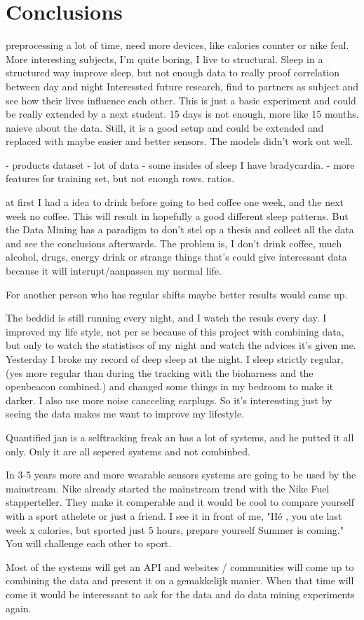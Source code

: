 \section{Conclusions}
	preprocessing a lot of time, 
	need more devices, like calories counter or nike feul.
	More interesting subjects, I'm quite boring, I live to structural.
	Sleep in a structured way improve sleep, 
		but not enough data to really proof correlation between day and night
	Interessted future research, find to partners as subject and see how their lives influence each other.
	This is just a basic experiment and could be really extended by a next student.
	15 days is not enough, more like 15 months. 
	naieve about the data. 
	Still, it is a good setup and could be extended and replaced with maybe easier and better sensors. 
 The models didn't work out well.

	- products dataset
	- lot of data
	-  some insides of sleep
	I have bradycardia. 
	- more features for training set, but not enough rows. ratios.

	at first I had a idea to drink before going to bed coffee one week, and the next week no coffee. This will result in hopefully a good different sleep patterns. But the Data Mining has a paradigm to don't stel op a thesis and collect all the data and see the conclusions afterwards. The problem is, I don't drink coffee, much alcohol, drugs, energy drink or strange things that's could give interessant data because it will interupt/aanpassen my normal life. 

	For another person who has regular shifts maybe better results would came up.


	The beddid is still running every night, and I watch the resuls every day. I improved my life style, not per se because of this project with combining data, but only to watch the statistiscs of my night and watch the advices it's given me. Yesterday I broke my record of deep sleep at the night. I sleep strictly regular, (yes more regular than during the tracking with the bioharness and the openbeacon combined.) and changed some things in my bedroom to make it darker. I also use more noise cancceling earplugs. So it's interessting just by seeing the data makes me want to improve my lifestyle. 

	Quantified jan is a selftracking freak an has a lot of systems, and he putted it all only. Only it are all sepered systems and not combinbed.

	In 3-5 years more and more wearable sensors systems are going to be used by the mainstream. Nike already started the mainstream trend with the Nike Fuel stapperteller. They make it comperable and it would be cool to compare yourself with a sport athelete or just a friend. I see it in front of me, "Hé , you ate last week x calories, but sported just 5 hours, prepare yourself Summer is coming." You will challenge each other to sport. 

	Most of the systems will get an API and websites / communities will come up to combining the data and present it on a gemakkelijk manier. When that time will come it would be interessant to ask for the data and do data mining experiments again. 
